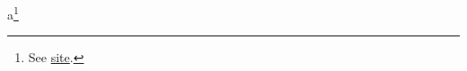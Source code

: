\documentclass{article}
\begin{document}
a\footnote{See \href{http://x.org/~y}{site}.}
\end{document}
